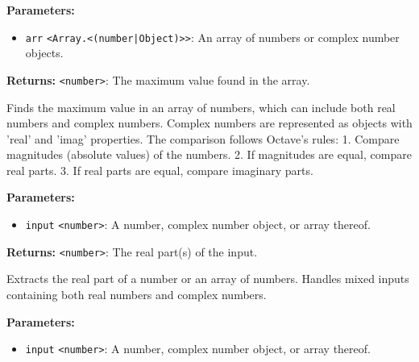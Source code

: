 \documentclass[12pt,a4paper]{article}
\begin{document}
\vspace{5mm}
\noindent {}


\noindent \textbf{Parameters:}
\begin{itemize}
  \item \texttt{arr} \texttt{<Array.<(number|Object)>>}: An array of numbers or complex number objects.
\end{itemize}

\noindent \textbf{Returns:} \texttt{<number>}: The maximum value found in the array.

\noindent Finds the maximum value in an array of numbers, which can include both real numbers and complex numbers.
Complex numbers are represented as objects with 'real' and 'imag' properties.
The comparison follows Octave's rules:
1. Compare magnitudes (absolute values) of the numbers.
2. If magnitudes are equal, compare real parts.
3. If real parts are equal, compare imaginary parts.

\vspace{5mm}
\noindent {}


\noindent \textbf{Parameters:}
\begin{itemize}
  \item \texttt{input} \texttt{<number>}: A number, complex number object, or array thereof.
\end{itemize}

\noindent \textbf{Returns:} \texttt{<number>}: The real part(s) of the input.

\noindent Extracts the real part of a number or an array of numbers.
Handles mixed inputs containing both real numbers and complex numbers.

\vspace{5mm}
\noindent {}


\noindent \textbf{Parameters:}
\begin{itemize}
  \item \texttt{input} \texttt{<number>}: A number, complex number object, or array thereof.
\end{itemize}
\end{document}
